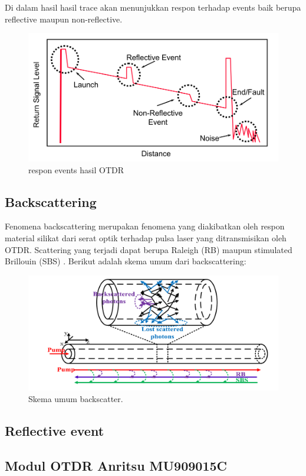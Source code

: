 \documentclass[12pt]{article}
\begin{document}
	Di dalam hasil hasil trace akan menunjukkan respon terhadap events baik berupa reflective maupun non-reflective.
	
	\begin{figure}[!ht]
		\centering
		\captionsetup{justification=centering}
		\includegraphics[width=0.7\linewidth]{images/Bab_2/Bab_2_7}
		\caption[respon events hasil OTDR]{\small{respon events hasil OTDR \cite{Anritsu2010}}}
	\end{figure}

	\subsection{Backscattering}
	
	Fenomena backscattering merupakan fenomena yang diakibatkan oleh respon material silikat dari serat optik terhadap pulsa laser yang ditransmisikan oleh OTDR.
	Scattering yang terjadi dapat berupa Raleigh (RB) maupun stimulated Brillouin (SBS) \cite{Feng2017}.
	Berikut adalah skema umum dari backscattering:
	
	\begin{figure}[!ht]
		\centering
		\captionsetup{justification=centering}
		\includegraphics[width=0.4\linewidth]{images/Bab_2/Bab_2_8}
		\caption[Skema umum backscatter.]{\small{Skema umum backscatter.}}
	\end{figure}

	\subsection{Reflective event}

	\subsection{Modul OTDR Anritsu MU909015C}
	
\end{document}
